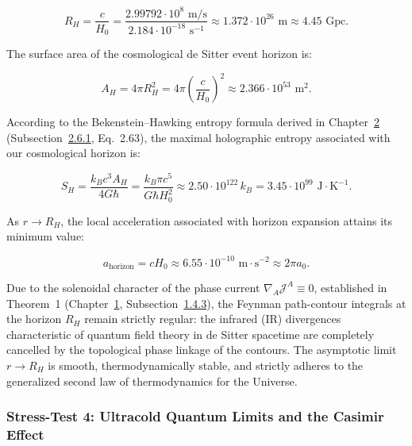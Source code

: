 \documentclass[11pt,a4paper]{article}
\theoremstyle{definition}
\begin{document}
\begin{equation}\label{eq:5.63}\tag{5.63}
R_H = \frac{c}{H_0} = \frac{2.99792 \cdot 10^8\text{ m/s}}{2.184 \cdot 10^{-18}\text{ s}^{-1}} \approx 1.372 \cdot 10^{26}\text{ m} \approx 4.45\text{ Gpc}.
\end{equation}

The surface area of the cosmological de Sitter event horizon is:

\begin{equation}\label{eq:5.64}\tag{5.64}
A_H = 4\pi R_H^2 = 4\pi \left( \frac{c}{H_0} \right)^2 \approx 2.366 \cdot 10^{53}\text{ m}^2.
\end{equation}

According to the Bekenstein--Hawking entropy formula derived in Chapter~\hyperref[sec:rozdil2]{2} (Subsection~\hyperref[sec:2.6.1]{2.6.1}, Eq.~2.63), the maximal holographic entropy associated with our cosmological horizon is:

\begin{equation}\label{eq:5.65}\tag{5.65}
S_H = \frac{k_B c^3 A_H}{4 G \hbar} = \frac{k_B \pi c^5}{G \hbar H_0^2} \approx 2.50 \cdot 10^{122}\,k_B = 3.45 \cdot 10^{99}\text{ J}\cdot\text{K}^{-1}.
\end{equation}

As $r \to R_H$, the local acceleration associated with horizon expansion attains its minimum value:

\begin{equation}\label{eq:5.66}\tag{5.66}
a_{\text{horizon}} = c H_0 \approx 6.55 \cdot 10^{-10}\text{ m}\cdot\text{s}^{-2} \approx 2\pi a_0.
\end{equation}

Due to the solenoidal character of the phase current $\nabla_A \mathcal{J}^A \equiv 0$, established in Theorem~1 (Chapter~\hyperref[sec:rozdil1]{1}, Subsection~\hyperref[sec:1.4.3]{1.4.3}), the Feynman path-contour integrals at the horizon $R_H$ remain strictly regular: the infrared (IR) divergences characteristic of quantum field theory in de Sitter spacetime are completely cancelled by the topological phase linkage of the contours. The asymptotic limit $r \to R_H$ is smooth, thermodynamically stable, and strictly adheres to the generalized second law of thermodynamics for the Universe.

\subsubsection{Stress-Test 4: Ultracold Quantum Limits and the Casimir Effect}\label{sec:5.4.4}
\end{document}
